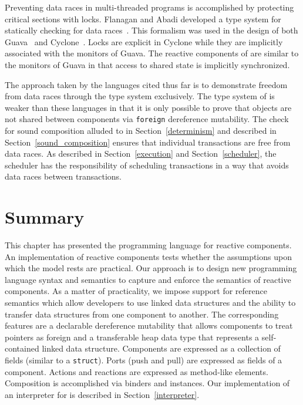 Preventing data races in multi-threaded programs is accomplished by protecting critical sections with locks.
Flanagan and Abadi developed a type system for statically checking for data races~\cite{Flanagan:1999:OTA:646734.701453, Abadi:2006:TSL:1119479.1119480}.
This formalism was used in the design of both Guava~\cite{Bacon:2000:GDJ:353171.353197} and Cyclone~\cite{Grossman:2003:TMC:604174.604177}.
Locks are explicit in Cyclone while they are implicitly associated with the monitors of Guava.
The reactive components of \rcgo{} are similar to the monitors of Guava in that access to shared state is implicitly synchronized.

The approach taken by the languages cited thus far is to demonstrate freedom from data races through the type system exclusively.
The type system of \rcgo{} is weaker than these languages in that it is only possible to prove that objects are not shared between components via \verb+foreign+ dereference mutability.
The check for sound composition alluded to in Section~\ref{determinism} and described in Section~\ref{sound_composition} ensures that individual transactions are free from data races.
As described in Section~\ref{execution} and Section~\ref{scheduler}, the scheduler has the responsibility of scheduling transactions in a way that avoids data races between transactions.

\section{Summary}
This chapter has presented the \rcgo programming language for reactive components.
An implementation of reactive components tests whether the assumptions upon which the model rests are practical.
Our approach is to design new programming language syntax and semantics to capture and enforce the semantics of reactive components.
As a matter of practicality, we impose support for reference semantics which allow developers to use linked data structures and the ability to transfer data structures from one component to another.
The corresponding features are a declarable dereference mutability that allows components to treat pointers as foreign and a transferable heap data type that represents a self-contained linked data structure.
Components are expressed as a collection of fields (similar to a \verb+struct+).
Ports (push and pull) are expressed as fields of a component.
Actions and reactions are expressed as method-like elements.
Composition is accomplished via binders and instances.
Our implementation of an interpreter for \rcgo is described in Section~\ref{interpreter}.


